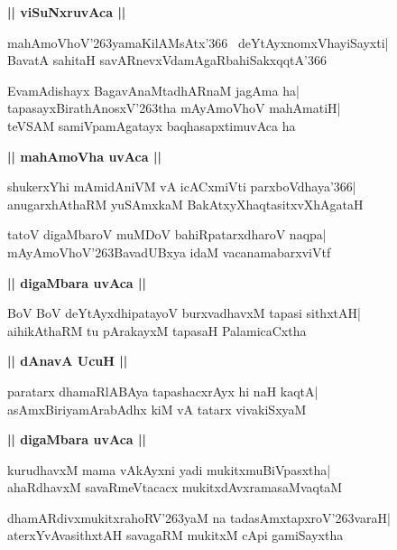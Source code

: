 \documentclass[twoside,12pt,openright]{book}
\def\S{\char'263}
\newcounter{shloka}[chapter]
\def\uvaca#1{\centerline{{\large\textbf{#1}}}}
\begin{document}
\uvaca{|| viSuNxruvAca ||}
\begin{shloka}%
mahAmoVhoV\S yamaKilAMsAtx\char'366 \ deYtAyxnomxVhayiSayxti|\\
BavatA sahitaH savARnevxVdamAgaRbahiSakxqqtA\char'366
\end{shloka}

\begin{shloka}%
EvamAdishayx BagavAnaMtadhARnaM jagAma ha|\\
tapasayxBirathAnosxV\S tha mAyAmoVhoV mahAmatiH|\\
teVSAM samiVpamAgatayx baqhasapxtimuvAca ha
\end{shloka}

\uvaca{|| mahAmoVha uvAca ||}
\begin{shloka}%
shukerxYhi mAmidAniVM vA icACxmiVti parxboVdhaya\char'366|\\
anugarxhAthaRM yuSAmxkaM BakAtxyXhaqtasitxvXhAgataH
\end{shloka}

\begin{shloka}%
tatoV digaMbaroV muMDoV bahiRpatarxdharoV naqpa|\\
mAyAmoVhoV\S BavadUBxya idaM vacanamabarxviVtf
\end{shloka}

\uvaca{|| digaMbara uvAca ||}
\begin{shloka}%
BoV BoV deYtAyxdhipatayoV burxvadhavxM tapasi sithxtAH|\\
aihikAthaRM tu pArakayxM tapasaH PalamicaCxtha
\end{shloka}

\uvaca{|| dAnavA UcuH ||}
\begin{shloka}%
paratarx dhamaRlABAya tapashacxrAyx hi naH kaqtA|\\
asAmxBiriyamArabAdhx kiM vA tatarx vivakiSxyaM
\end{shloka}

\uvaca{|| digaMbara uvAca ||}
\begin{shloka}%
kurudhavxM mama vAkAyxni yadi mukitxmuBiVpasxtha|\\
ahaRdhavxM savaRmeVtacacx mukitxdAvxramasaMvaqtaM 
\end{shloka}

\begin{shloka}%
dhamARdivxmukitxrahoRV\S yaM na tadasAmxtapxroV\S varaH|\\
aterxYvAvasithxtAH savagaRM mukitxM cApi gamiSayxtha
\end{shloka}
\end{document}
